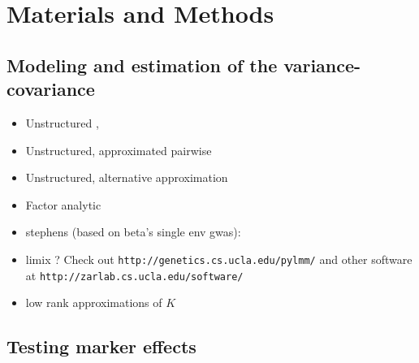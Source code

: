 \documentclass[12pt]{article}
\begin{document}
\section{Materials and Methods}

\subsection{Modeling and estimation of the variance-covariance}

\begin{itemize}
	\item Unstructured \cite{korte_etal_2012}, \cite{zhou_stephens_2014}
\item Unstructured, approximated pairwise \cite{furlotte_eskin_2015}
\item Unstructured, alternative approximation \cite{joo_etal_2016}
\item Factor analytic \cite{millet_etal_2016}	
\item stephens (based on beta's single env gwas): \cite{stephens_2013}
	\item limix ? Check out \verb|http://genetics.cs.ucla.edu/pylmm/| and other software at \verb|http://zarlab.cs.ucla.edu/software/|
\item low rank approximations of $K$
\end{itemize}

\subsection{Testing marker effects}
\end{document}
